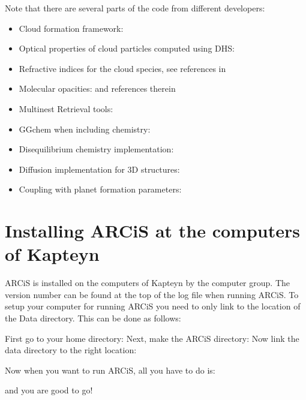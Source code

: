 \documentclass[12pt]{article}
\begin{document}
Note that there are several parts of the code from different developers:
\begin{itemize}
\item Cloud formation framework: \cite{2019A&A...622A.121O}
\item Optical properties of cloud particles computed using DHS: \cite{2005A&A...432..909M, 1981ApOpt..20.3657T}
\item Refractive indices for the cloud species, see references in \cite{2020A&A...642A..28M}
\item Molecular opacities: \cite{2021A&A...646A..21C} and references therein
\item Multinest Retrieval tools: \cite{2008MNRAS.384..449F, 2009MNRAS.398.1601F, 2019OJAp....2E..10F}
\item GGchem when including chemistry: \cite{2018A&A...614A...1W}
\item Disequilibrium chemistry implementation: \cite{2021A&A...656A..90K}
\item Diffusion implementation for 3D structures: \cite{2022A&A...665A...2C}
\item Coupling with planet formation parameters: \cite{2022A&A...667A.147K}
\end{itemize}

\section{Installing ARCiS at the computers of Kapteyn}

ARCiS is installed on the computers of Kapteyn by the computer group. The version number can be found at the top of the log file when running ARCiS.
To setup your computer for running ARCiS you need to only link to the location of the Data directory. This can be done as follows:

First go to your home directory:
Next, make the ARCiS directory:
Now link the data directory to the right location:
\vspace{-2cm}\\

Now when you want to run ARCiS, all you have to do is:

and you are good to go!

\end{document}
